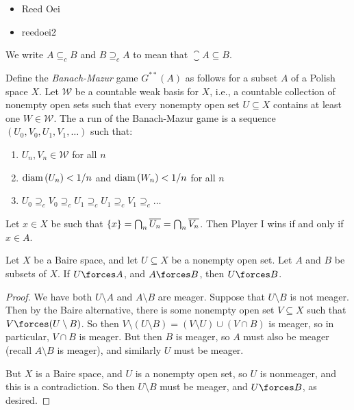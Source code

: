 \documentclass[10pt]{article}
\begin{document}
\begin{itemize}
    \item[] Reed Oei
    \item[] reedoei2
\end{itemize}

We write $A \subseteq_c B$ and $B \supseteq_c A$ to mean that $\closure{A} \subseteq B$.

Define the \emph{Banach-Mazur} game $G^{**}(A)$ as follows for a subset $A$ of a Polish space $X$.
Let $\mathcal{W}$ be a countable weak basis for $X$, i.e., a countable collection of nonempty open sets such that every nonempty open set $U \subseteq X$ contains at least one $W \in \mathcal{W}$.
The a run of the Banach-Mazur game is a sequence $(U_0, V_0, U_1, V_1, \ldots)$ such that:
\begin{enumerate}[label=(\roman*)]
    \item $U_n, V_n \in \mathcal{W}$ for all $n$
    \item $\text{diam} \left( U_n \right) < 1/n$ and $\text{diam} \left( W_n \right) < 1/n$ for all $n$
    \item $U_0 \supseteq_c V_0 \supseteq_c U_1 \supseteq_c U_1 \supseteq_c V_1 \supseteq_c \ldots$
\end{enumerate}
Let $x \in X$ be such that ${\left\{ {x} \right\}} = \bigcap_n \overline{U_n} = \bigcap_n \overline{V_n}$.
Then Player I wins if and only if $x \in A$.

\begin{proposition}\label{prop:forces-baire-meas}
    Let $X$ be a Baire space, and let $U \subseteq X$ be a nonempty open set.
    Let $A$ and $B$ be subsets of $X$.
    If $U \forces A$, and $A \forces B$, then $U \forces B$.
\end{proposition}
\begin{proof}
    We have both $U \setminus A$ and $A \setminus B$ are meager.
    Suppose that $U \setminus B$ is not meager.
    Then by the Baire alternative, there is some nonempty open set $V \subseteq X$ such that $V \forces (U \setminus B)$.
    So then $V \setminus (U \setminus B) = (V \setminus U) \cup (V \cap B)$ is meager, so in particular, $V \cap B$ is meager.
    But then $B$ is meager, so $A$ must also be meager (recall $A \setminus B$ is meager), and similarly $U$ must be meager.

    But $X$ is a Baire space, and $U$ is a nonempty open set, so $U$ is nonmeager, and this is a contradiction.
    So then $U \setminus B$ must be meager, and $U \forces B$, as desired.
\end{proof}
\end{document}
